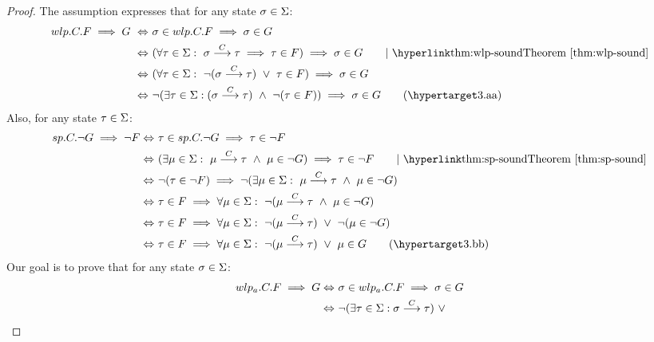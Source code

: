 \begin{proof}
	The assumption expresses that for any state $\sigma\in\S$:
\begin{align*} 
	wlp.C.F\implies G\  \Leftrightarrow&\ \sigma\in wlp.C.F \implies \sigma\in G \\
	\Leftrightarrow&\ ( \forall \tau\in\S:\ \sigma\goto{C}\tau\implies  \tau\in F) \implies \sigma\in G \tag*{$\mid$ \thm{wlp-sound}} \\
	\Leftrightarrow&\ (\forall \tau\in\S:\ \neg(\sigma\goto{C}\tau)\ \vee\ \tau\in F) \implies \sigma\in G \\
	\Leftrightarrow&\ \neg(\exists\tau\in\S:(\sigma\goto{C}\tau)\ \wedge\ \neg(\tau\in F)) \implies \sigma\in G \tag{\lblth{a}} \\
\end{align*}
Also, for any state $\tau\in\S$: 
\begin{align*}
	sp.C.\neg G \implies \neg F \Leftrightarrow&\ \tau\in sp.C.\neg G \implies \tau\in \neg F \\
	\Leftrightarrow&\  (\exists \mu\in\S:\ \mu\goto{C}\tau\ \wedge\ \mu\in\neg G )\implies \tau\in\neg F \tag*{$\mid$ \thm{sp-sound}}\\
	\Leftrightarrow&\  \neg (\tau\in\neg F) \implies \neg (\exists \mu\in\S:\ \mu\goto{C}\tau\ \wedge\ \mu\in\neg G ) \\
	\Leftrightarrow&\  \tau\in F \implies \forall \mu\in\S:\ \neg (\mu\goto{C}\tau\ \wedge\ \mu\in\neg G)\\
	\Leftrightarrow&\  \tau\in F \implies \forall \mu\in\S:\ \neg (\mu\goto{C}\tau)\ \vee\ \neg(\mu\in\neg G)\\
	\Leftrightarrow&\  \tau\in F \implies \forall \mu\in\S:\ \neg (\mu\goto{C}\tau)\ \vee\ \mu\in G
	\tag{\lblth{b}} \\
\end{align*}
Our goal is to prove that for any state $\sigma\in\S$:
\begin{align*}
	wlp_a.C.F \implies G \Leftrightarrow&\ \sigma\in wlp_a.C.F \implies \sigma\in G \\
	\Leftrightarrow&\  \neg(\exists \tau\in\S: \sigma\goto{C}\tau) \ \vee\ 

\end{align*}
\end{proof}
